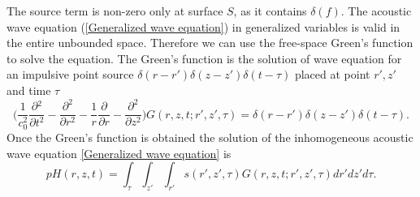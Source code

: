 \documentclass[a4paper]{article}
\begin{document}
The source term is non-zero only at surface $S$, as it contains $\delta (f)$. The acoustic wave equation (\ref{Generalized wave equation}) in generalized variables is valid in the entire unbounded space. Therefore we can use the free-space Green's function to solve the equation. The Green's function is the solution of wave equation for an impulsive point source $\delta(r - r')\delta(z - z')\delta(t - \tau)$ placed at point $r', z'$ and time $\tau$
\begin{equation}\label{green}
	\Bigg( \frac{1}{c_{0}^2}\frac{\partial{}^{2}}{\partial{t}^{2}}- \frac{\partial^2}{\partial r^2} - \frac{1}{r}\frac{\partial}{\partial r} - \frac{\partial^2}{\partial z^2}\Bigg) {G(r, z, t; r', z', \tau )} = \delta(r - r')\delta(z - z')\delta(t - \tau).
\end{equation}
Once the Green's function is obtained the solution of the inhomogeneous acoustic wave equation \ref{Generalized wave equation} is 
\begin{equation}\label{pressure}
	pH(r, z, t) = \int_{\tau}\int_{z'}\int_{r'} s(r', z', \tau)G(r, z, t; r', z', \tau ) dr'dz'd\tau.
\end{equation}
\printbibliography
\end{document}
